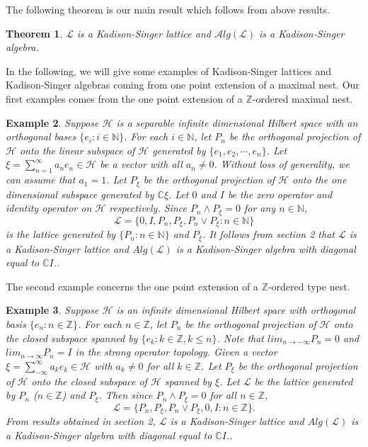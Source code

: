 \documentclass[12pt]{article}
\newtheorem{theorem}{Theorem}
\newtheorem{example}[theorem]{Example}
\def\H{{\mathscr{H} }}\def\L{{\mathscr{L}}}
\def\N{{\mathbb{N}}}
\def\Z{{\mathbb{Z}}}\def\C{{\mathbb{C}}}
\newcommand{\LLL}{\mathscr L} %
\def\Alg{\mathcal Alg}
\def\C{\mathbb C} %
\def\Z{\mathbb Z} %
\def\N{\mathbb N} %
\begin{document}
The following theorem is our main result which follows from above
results.

\begin{theorem}
$\LLL$ is a Kadison-Singer lattice and $\Alg(\LLL)$ is a
Kadison-Singer algebra.
\end{theorem}



In the following, we will give some examples of
Kadison-Singer lattices and Kadison-Singer algebras coming from one point extension of a maximal nest. 
Our first examples comes from the one point extension of a
$\mathbb{Z}$-ordered maximal nest.

\noindent\begin{example} Suppose $\mathscr{H}$ is a separable
infinite dimensional Hilbert space with an orthogonal bases $\{e_i:
i\in \mathbb{N}\}$. For each $i\in \mathbb{N}$, let $P_n$ be the
orthogonal projection of $\mathscr{H}$ onto the linear subspace of
$\H$ generated by $\{e_1, e_2, \cdots, e_n\}$. Let
$\xi=\sum_{n=1}^{\infty}a_ne_n\in\H$ be a vector with all $a_n\neq
0$. Without loss of generality, we can assume that $a_1=1$. Let
$P_{\xi}$ be the orthogonal projection of $\mathscr{H}$ onto the one
dimensional subspace generated by $\mathbb{C}\xi$. Let $0$ and $I$
be the zero operator and identity operator on $\mathscr{H}$
respectively. Since $P_n\wedge P_{\xi}=0$ for any $n\in \N$,
$$\mathscr{L}=\{0, I, P_n, P_{\xi}, P_n\vee P_{\xi}: n\in
\mathbb{N}\}$$ is the lattice generated by $\{P_n: n\in
\mathbb{N}\}$ and $P_{\xi}$. It follows from section 2 that
$\mathscr{L}$ is a Kadison-Singer lattice and $Alg(\mathscr{L})$ is
a Kadison-Singer algebra with diagonal equal to $\mathbb{C}I$..
\end{example}

The second example concerns the one point extension of a
$\mathbb{Z}$-ordered type nest.

\noindent\begin{example} Suppose $\H$ is an infinite dimensional
Hilbert space with orthogonal basis $\{e_n: n\in \mathbb{Z}\}$. For
each $n\in \mathbb{Z}$, let $P_n$ be the orthogonal projection of
$\H$ onto the closed subspace spanned by $\{e_k: k\in \Z, k\leq
n\}$. Note that $lim_{n\rightarrow -\infty}P_n=0$ and
$lim_{n\rightarrow \infty}P_n=I$ in the strong operator topology.
Given a vector $\xi=\sum_{-\infty}^{\infty}a_ke_k\in \H$ with
$a_k\neq 0$ for all $k\in \Z$. Let $P_{\xi}$ be the orthogonal
projection of $\H$ onto the closed subspace of $\H$ spanned by
$\xi$. Let $\L$ be the lattice generated by $P_{n}$ ($n\in \Z$) and
$P_{\xi}$. Then since $P_n\wedge P_{\xi}=0$ for all $n\in \Z$,
$$\L=\{P_n, P_{\xi}, P_{n}\vee P_{\xi}, 0, I: n\in \Z\}.$$ From
results obtained in section 2, $\mathscr{L}$ is a Kadison-Singer
lattice and $Alg(\mathscr{L})$ is a Kadison-Singer algebra with
diagonal equal to $\mathbb{C}I$..
\end{example}
\end{document}
